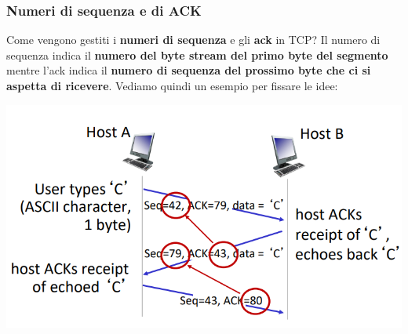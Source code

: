 \documentclass[12pt]{article}
\begin{document}
\subsubsection{Numeri di sequenza e di ACK}
Come vengono gestiti i \textbf{numeri di sequenza} e gli \textbf{ack} in TCP? Il numero di sequenza indica il \textbf{numero del byte stream del primo byte del segmento} mentre l'ack
indica il \textbf{numero di sequenza del prossimo byte che ci si aspetta di ricevere}. Vediamo quindi un esempio per fissare le idee:
\begin{center}
    \includegraphics[width = 0.80\linewidth]{Images/57.png}
\end{center}
\end{document}
